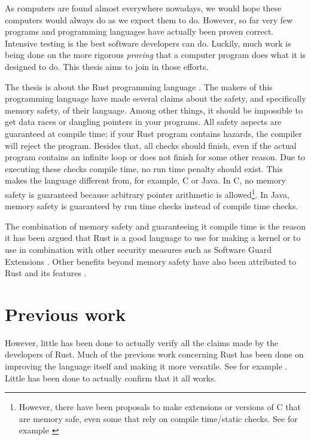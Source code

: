As computers are found almost everywhere nowadays, we would hope these computers would always do as we expect them to do. However, so far very few programs and programming languages have actually been proven correct. Intensive testing is the best software developers can do. Luckily, much work is being done on the more rigorous \emph{proving} that a computer program does what it is designed to do. This thesis aims to join in those efforts. 

The thesis is about the Rust programming language \citep{matsakis2014rust}. The makers of this programming language have made several claims about the safety, and specifically memory safety, of their language. Among other things, it should be impossible to get data races or dangling pointers in your programs. All safety aspects are guaranteed at compile time; if your Rust program contains hazards, the compiler will reject the program. Besides that, all checks should finish, even if the actual program contains an infinite loop or does not finish for some other reason. Due to executing these checks compile time, no run time penalty should exist. This makes the language different from, for example, C or Java. In C, no memory safety is guaranteed because arbitrary pointer arithmetic is allowed\footnote{However, there have been proposals to make extensions or versions of C that are memory safe, even some that rely on compile time/static checks. See for example \cite{dhurjati2003memory}}. In Java, memory safety is guaranteed by run time checks instead of compile time checks. 

The combination of memory safety and guaranteeing it compile time is the reason it has been argued that Rust is a good language to use for making a kernel \citep{levy2017kernel} or to use in combination with other security measures such as Software Guard Extensions \citep{ding2017sgx}. Other benefits beyond memory safety have also been attributed to Rust and its features \citep{balasubramanian2017system}.

\section{Previous work}
However, little has been done to actually verify all the claims made by the developers of Rust. Much of the previous work concerning Rust has been done on improving the language itself and making it more versatile. See for example \cite{jespersen2015session}. Little has been done to actually confirm that it all works. 

